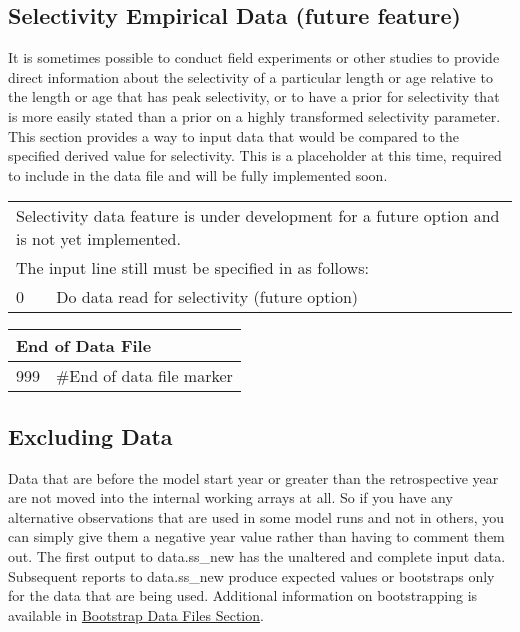 \subsection{Selectivity Empirical Data (future feature)}
It is sometimes possible to conduct field experiments or other studies to provide direct information about the selectivity of a particular length or age relative to the length or age that has peak selectivity, or to have a prior for selectivity that is more easily stated than a prior on a highly transformed selectivity parameter. This section provides a way to input data that would be compared to the specified derived value for selectivity. This is a placeholder at this time, required to include in the data file and will be fully implemented soon.

\begin{center}
	\begin{tabular}{p{1cm} p{1.5cm} p{1.5cm} p{1.5cm} p{1.5cm} p{1.5cm} p{2.5cm} p{2.5cm} p{2.5cm}}
		\multicolumn{9}{l}{Selectivity data feature is under development for a future option and is not yet implemented.} \\
		\multicolumn{9}{l}{The input line still must be specified in as follows:} \\
		\hline
		0 & \multicolumn{8}{l}{Do data read for selectivity (future option)} \Tstrut\Bstrut\\
        \hline
	\end{tabular}
\end{center}

\begin{center}
	\begin{tabular}{p{2cm} p{14cm}} \\
		\multicolumn{2}{l}{End of Data File} \\
		\hline
		999 & \#End of data file marker \Tstrut\Bstrut\\
		\hline
	\end{tabular}
\end{center}


\subsection{Excluding Data}
Data that are before the model start year or greater than the retrospective year are not moved into the internal working arrays at all. So if you have any alternative observations that are used in some model runs and not in others, you can simply give them a negative year value rather than having to comment them out. The first output to data.ss\_new has the unaltered and complete input data. Subsequent reports to data.ss\_new produce expected values or bootstraps only for the data that are being used. Additional information on bootstrapping is available in \hyperlink{bootstrap}{Bootstrap Data Files Section}. 

